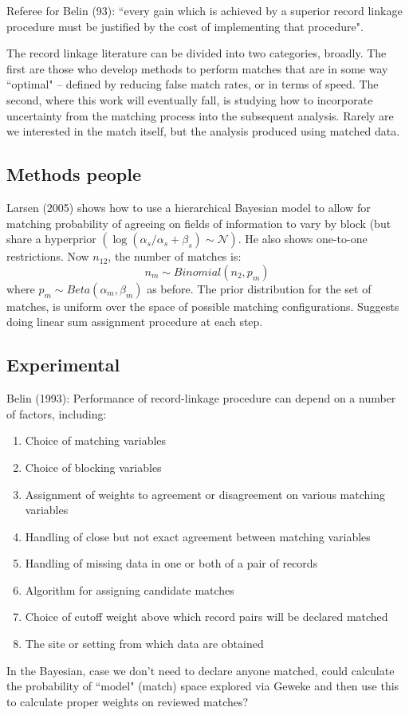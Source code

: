 \documentclass[11pt,reqno]{amsart}
\begin{document}
Referee for Belin (93): ``every gain which is achieved by a superior record linkage procedure must be justified by the cost of implementing that procedure". 


The record linkage literature can be divided into two categories, broadly.  The first are those who develop methods to perform matches that are in some way ``optimal" -- defined by reducing false match rates, or in terms of speed.  The second, where this work will eventually fall, is studying how to incorporate uncertainty from the matching process into the subsequent analysis.  Rarely are we interested in the match itself, but the analysis produced using matched data.  
\subsection{Methods people}
Larsen (2005) shows how to use a hierarchical Bayesian model to allow for matching probability of agreeing on fields of information to vary by block (but share a hyperprior $(\log(\alpha_s/\alpha_s+\beta_s) \sim \mathcal{N})$.  He also shows one-to-one restrictions.  Now $n_{12}$, the number of matches is:
\[ n_{m} \sim Binomial(n_2, p_m) \] 
where $p_m \sim Beta(\alpha_m, \beta_m)$ as before. The prior distribution for the set of matches, is uniform over the space of possible matching configurations. Suggests doing linear sum assignment procedure at each step.  %

\subsection{Experimental}
Belin (1993): Performance of record-linkage procedure can depend on a number of factors, including:
\begin{enumerate}
\item Choice of matching variables
\item Choice of blocking variables
\item Assignment of weights to agreement or disagreement on various matching variables
\item Handling of close but not exact agreement between matching variables
\item Handling of missing data in one or both of a pair of records
\item Algorithm for assigning candidate matches
\item Choice of cutoff weight above which record pairs will be declared matched
\item The site or setting from which data are obtained
\end{enumerate}
In the Bayesian, case we don't need to declare anyone matched, could calculate the probability of  ``model" (match) space explored via Geweke and then use this to calculate proper weights on reviewed matches?  
\end{document}
